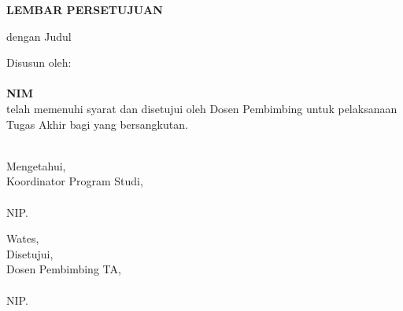 
\newpage
{}
\begin{center}
    \begin{doublespace}
        \textbf{\large \MakeUppercase{lembar persetujuan}}
    \end{doublespace}
\end{center}

\begin{center}
    {\tipe} dengan Judul
\end{center}

\begin{center}
    \begin{doublespace}
        \textbf{\large \MakeUppercase {\judulid}}
    \end{doublespace}
\end{center}

\begin{center}
    Disusun oleh:\\
    \textbf{\penulis}\\
    \textbf{NIM \nim}\\[1.5cm]

    telah memenuhi syarat dan disetujui oleh Dosen Pembimbing untuk pelaksanaan Tugas Akhir bagi yang bersangkutan.\\[0.75cm]
\end{center}

\begin{minipage}{0.35\textwidth}
    \hfill\\[2em]
    Mengetahui,\\
    Koordinator Program Studi,\\[2cm]
    \koorprodi\\
    NIP. \NIPkoorprodi
\end{minipage}
\hfill
\begin{minipage}{0.47\textwidth}
    Wates, \tglpersetujuan\\[1em]
    Disetujui,\\
    Dosen Pembimbing TA,\\[2cm]
    \pembimbing\\
    NIP. \NIPpembimbing
\end{minipage}%
